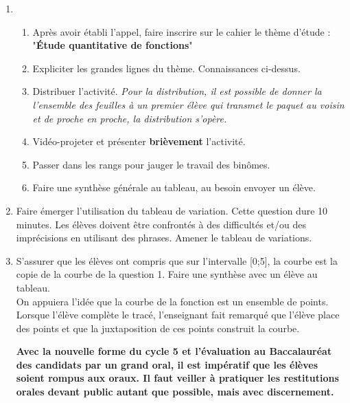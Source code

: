 \begin{enumerate}
\item 
\begin{enumerate}
\item Après avoir établi l'appel, faire inscrire sur le cahier le thème d'étude : "\textbf{Étude quantitative de fonctions}"
\item Expliciter les grandes lignes du thème. Connaissances ci-dessus.
\item Distribuer l'activité. \textit{Pour la distribution, il est possible de donner la l'ensemble des feuilles à un premier élève qui transmet le paquet au voisin et de proche en proche, la distribution s'opère.}
\item Vidéo-projeter et présenter \textbf{brièvement} l'activité.
\item Passer dans les rangs pour jauger le travail des binômes.
\item Faire une synthèse générale au tableau, au besoin envoyer un élève.
\end{enumerate}
\item Faire émerger l'utilisation du tableau de variation. Cette question dure 10 minutes. Les élèves doivent être confrontés à des difficultés et/ou des imprécisions en utilisant des phrases. Amener le tableau de variations.
\item S'assurer que les élèves ont compris que sur l'intervalle [0;5], la courbe est la copie de la courbe de la question 1. Faire une synthèse avec un élève au tableau.\\
On appuiera l'idée que la courbe de la fonction est un ensemble de points. Lorsque l'élève complète le tracé, l'enseignant fait remarqué que l'élève place des points et que la juxtaposition de ces points construit la courbe.

\textbf{Avec la nouvelle forme du cycle 5 et l'évaluation au Baccalauréat des candidats par un grand oral, il est impératif que les élèves soient rompus aux oraux. Il faut veiller à pratiquer les restitutions orales devant public autant que possible, mais avec discernement.}


%
%
\end{enumerate}

